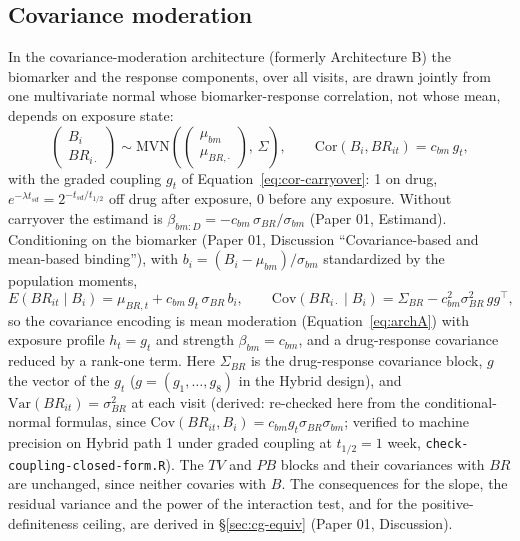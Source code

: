 \documentclass[11pt]{article}
\newcommand{\code}[1]{\texttt{#1}}
\begin{document}
\subsection{Covariance moderation}

In the covariance-moderation architecture (formerly Architecture B)
the biomarker and the response components, over all visits, are drawn
jointly from one multivariate normal whose biomarker-response
correlation, not whose mean, depends on exposure state:
\begin{equation}
\begin{pmatrix} B_i \\ BR_{i\cdot} \end{pmatrix} \sim
\mathrm{MVN}\!\left(
  \begin{pmatrix}\mu_{bm} \\ \mu_{BR,\cdot}\end{pmatrix},\,
  \Sigma\right), \qquad
\mathrm{Cor}(B_i, BR_{it}) = c_{bm}\, g_t,
\label{eq:archB}
\end{equation}
with the graded coupling $g_t$ of Equation~\eqref{eq:cor-carryover}:
1 on drug, $e^{-\lambda t_{sd}} = 2^{-t_{sd}/t_{1/2}}$ off drug after
exposure, 0 before any exposure. Without carryover the estimand is
$\beta_{bm:D} = -c_{bm}\,\sigma_{BR}/\sigma_{bm}$ (Paper 01,
Estimand). Conditioning on the biomarker (Paper 01, Discussion
``Covariance-based and mean-based binding''), with
$b_i = (B_i - \mu_{bm})/\sigma_{bm}$ standardized by the population
moments,
\begin{equation}
E(BR_{it} \mid B_i) = \mu_{BR,t} + c_{bm}\, g_t\, \sigma_{BR}\, b_i,
\qquad
\mathrm{Cov}(BR_{i\cdot} \mid B_i) = \Sigma_{BR} - c_{bm}^2
  \sigma_{BR}^2\, g g^\top,
\label{eq:archB-conditional}
\end{equation}
so the covariance encoding is mean moderation
(Equation~\eqref{eq:archA}) with exposure profile $h_t = g_t$ and
strength $\beta_{bm} = c_{bm}$, and a drug-response covariance reduced
by a rank-one term. Here $\Sigma_{BR}$ is the drug-response covariance
block, $g$ the vector of the $g_t$ ($g = (g_1, \ldots, g_8)$ in the
Hybrid design), and $\mathrm{Var}(BR_{it}) = \sigma_{BR}^2$ at each
visit (derived: re-checked here from the conditional-normal formulas,
since $\mathrm{Cov}(BR_{it}, B_i) = c_{bm} g_t
\sigma_{BR}\sigma_{bm}$; verified to machine precision on Hybrid path
1 under graded coupling at $t_{1/2} = 1$ week,
\code{check-coupling-closed-form.R}). The $TV$ and $PB$ blocks and
their covariances with $BR$ are unchanged, since neither covaries with
$B$. The consequences for the slope, the residual variance and the
power of the interaction test, and for the positive-definiteness
ceiling, are derived in \S\ref{sec:cg-equiv} (Paper 01, Discussion).
\end{document}
